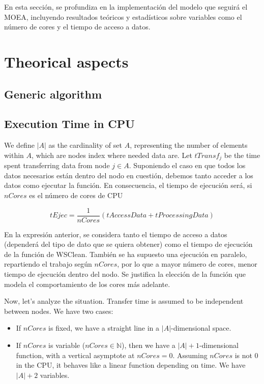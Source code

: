 \documentclass{article}
\begin{document}
En esta sección, se profundiza en la implementación del modelo que seguirá el MOEA, incluyendo resultados teóricos y estadísticos sobre variables como el número de cores y el tiempo de acceso a datos.

\section{Theorical aspects}

\subsection{Generic algorithm}

\subsection{Execution Time in CPU}

We define $|A|$ as the cardinality of set $A$, representing the number of elements within $A$, which are nodes index where needed data are. Let $tTransf_j$ be the time spent transferring data from node $j \in A$. Suponiendo el caso en que todos los datos necesarios están dentro del nodo en cuestión, debemos tanto acceder a los datos como ejecutar la función. En consecuencia, el tiempo de ejecución será, si \(nCores\) es el número de cores de CPU

\[
tEjec = \frac{1}{nCores}(tAccessData + tProcessingData)
\]

En la expresión anterior, se considera tanto el tiempo de acceso a datos (dependerá del tipo de dato que se quiera obtener) como el tiempo de ejecución de la función de WSClean. También se ha supuesto una ejecución en paralelo, repartiendo el trabajo según \(nCores\), por lo que a mayor número de cores, menor tiempo de ejecución dentro del nodo. Se justifica la elección de la función que modela el comportamiento de los cores más adelante.

Now, let's analyze the situation. Transfer time is assumed to be independent between nodes. We have two cases:

\begin{itemize}
  \item If $nCores$ is fixed, we have a straight line in a $|A|$-dimensional space.
  \item If $nCores$ is variable ($nCores \in \mathbb{N}$), then we have a $|A|+1$-dimensional function, with a vertical asymptote at $nCores=0$. Assuming $nCores$ is not 0 in the CPU, it behaves like a linear function depending on time. We have $|A|+2$ variables.
\end{itemize}
\end{document}
